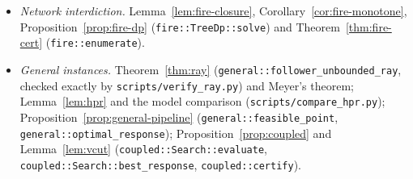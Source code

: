 {\begin{itemize}
neither proved nor assumed in Lean; Theorem~\ref{thm:clique-lb4};
Proposition~\ref{prop:clique-sizes} and the 170 solver verdicts; that the
instance files have the stated $n$, $m$ and $k$ and that each certificate
partition has at most $k$ inside edges (Lean takes these numbers as
hypotheses).
\item \emph{Network interdiction.} Lemma~\ref{lem:fire-closure},
Corollary~\ref{cor:fire-monotone}, Proposition~\ref{prop:fire-dp}
(\texttt{fire::TreeDp::solve}) and Theorem~\ref{thm:fire-cert}
(\texttt{fire::enumerate}).
\item \emph{General instances.} Theorem~\ref{thm:ray}
(\texttt{general::follower\_unbounded\_ray}, checked exactly by
\texttt{scripts/verify\_ray.py}) and Meyer's theorem; Lemma~\ref{lem:hpr} and
the model comparison (\texttt{scripts/compare\_hpr.py});
Proposition~\ref{prop:general-pipeline} (\texttt{general::feasible\_point},
\texttt{general::optimal\_response}); Proposition~\ref{prop:coupled} and
Lemma~\ref{lem:vcut} (\texttt{coupled::Search::evaluate},
\texttt{coupled::Search::best\_response}, \texttt{coupled::certify}).
\end{itemize}
\par}
